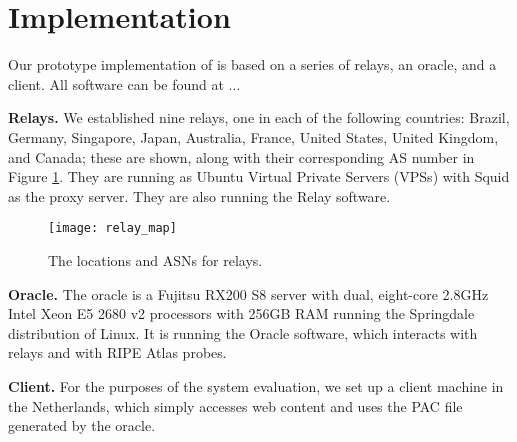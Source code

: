 \section{Implementation}
Our prototype implementation of \system{} is based on a series of relays, an oracle, and 
a client. All \system{} software can be found at ... 

{\bf Relays.}  We established nine relays, one in each of the following countries: Brazil, 
Germany, Singapore, Japan, Australia, France, United States, United Kingdom, and Canada; these 
are shown, along with their corresponding AS number in Figure \ref{fig:relay_locations}.  
They are running as Ubuntu Virtual Private Servers (VPSs) with 
Squid as the proxy server.  They are also running the \system{} Relay software.

\begin{figure}[b!]
\centering
\texttt{[image: relay\_map]}
\caption{The locations and ASNs for \system{} relays.}
\label{fig:relay_locations}
\end{figure}

{\bf Oracle.}  The oracle is a Fujitsu RX200 S8 server with dual, 
eight-core 2.8GHz Intel Xeon E5 2680 v2 processors with 256GB RAM running the 
Springdale distribution of Linux. It is running the \system{} Oracle software, 
which interacts with relays and with RIPE Atlas probes.

{\bf Client.} For the purposes of the system evaluation, we set up a client 
machine in the Netherlands, which simply accesses web content and uses the PAC 
file generated by the oracle. 
